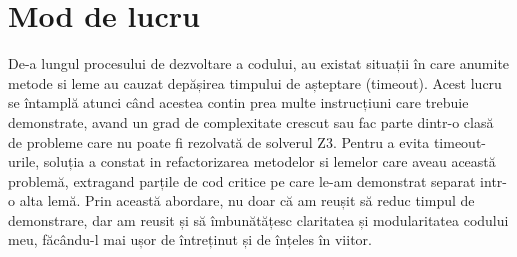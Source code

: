 \section{Mod de lucru}
De-a lungul procesului de dezvoltare a codului, au existat situații în care anumite metode si leme au cauzat depășirea timpului de așteptare (timeout). Acest lucru se întamplă atunci când acestea contin prea multe instrucțiuni care trebuie demonstrate, avand un grad de complexitate crescut sau fac parte dintr-o clasă de probleme care nu poate fi rezolvată de solverul Z3.
Pentru a evita timeout-urile, soluția a constat in refactorizarea metodelor si lemelor care aveau această problemă, extragand parțile de cod critice pe care le-am demonstrat separat intr-o alta lemă. Prin această abordare, nu doar că am reușit să reduc timpul de demonstrare, dar am reusit și să îmbunătățesc claritatea și modularitatea codului meu, făcându-l mai ușor de întreținut și de înțeles în viitor.


